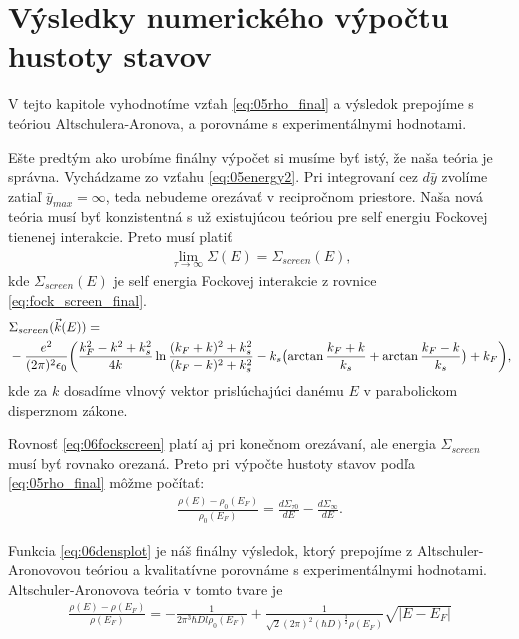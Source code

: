 \section{Výsledky numerického výpočtu hustoty stavov}
V tejto kapitole vyhodnotíme vzťah \eqref{eq:05rho_final} a výsledok prepojíme s teóriou Altschulera-Aronova, a porovnáme s experimentálnymi hodnotami. 

Ešte predtým ako urobíme finálny výpočet si musíme byť istý, že naša teória je správna. Vychádzame zo vzťahu \eqref{eq:05energy2}. Pri integrovaní cez $d\bar{y}$ zvolíme zatiaľ $\bar{y}_{max}=\infty$, teda nebudeme orezávať v recipročnom priestore. Naša nová teória musí byť konzistentná s už existujúcou teóriou pre self energiu Fockovej tienenej interakcie. Preto musí platiť
\begin{align}
\label{eq:06consistency}
\lim_{\tau\to\infty}\Sigma(E) = \Sigma_{screen}(E) \text{,}
\end{align}
kde $\Sigma_{screen}(E)$ je self energia Fockovej interakcie z rovnice \eqref{eq:fock_screen_final}.
 \begin{align}
  \label{eq:06fockscreen}
  &\Sigma_{screen}(\vec{k}(E))= \\ \notag
  &-\frac{e^2}{(2\pi)^2\epsilon_0} \biggl(
    \frac{k_F^2-k^2+k_s^2}{4k} \ln{\frac{(k_F+k)^2+k_s^2}{(k_F-k)^2+k_s^2}}-k_s\bigl(\arctan{\frac{k_F+k}{k_s}}+\arctan{\frac{k_F-k}{k_s}}\bigr)+k_F\biggr) \text{,}
 \end{align}
 kde za $k$ dosadíme vlnový vektor prislúchajúci danému $E$ v parabolickom disperznom zákone.
 
 Rovnosť \eqref{eq:06fockscreen} platí aj pri konečnom orezávaní, ale energia $\Sigma_{screen}$ musí byť rovnako orezaná. Preto pri výpočte hustoty stavov podľa 
 \eqref{eq:05rho_final} môžme počítať:                                      
 \begin{align}
 \label{eq:06densplot}
\frac{\rho(E)-\rho_0(E_F)}{\rho_0(E_F)}=\frac{d\Sigma_{\tau0}}{dE}-\frac{d\Sigma_{\infty}}{dE} \text{.}
 \end{align}

Funkcia \eqref{eq:06densplot} je náš finálny výsledok, ktorý prepojíme z Altschuler-Aronovovou teóriou a kvalitatívne porovnáme s experimentálnymi hodnotami. 
Altschuler-Aronovova teória v tomto tvare je 
\begin{align}
\label{eq:06altschuler}
\frac{\rho(E)-\rho(E_F)}{\rho(E_F)}= -\frac{1}{2\pi^3\hbar D l \rho_0(E_F)}+\frac{1}{\sqrt{2}(2\pi)^2(\hbar D)^\frac{3}{2}\rho(E_F)}\sqrt{|E-E_F|}
\end{align}

